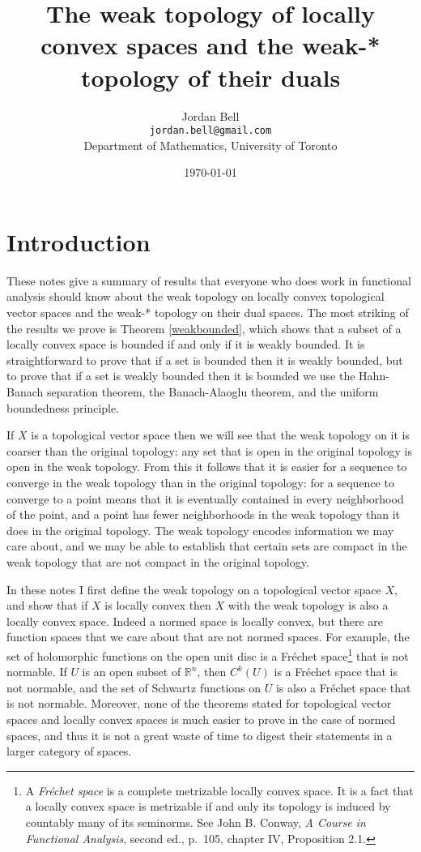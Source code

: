 \documentclass{article}
\begin{document}
\title{The weak topology of locally convex spaces and the weak-* topology of their duals}
\author{Jordan Bell\\ \texttt{jordan.bell@gmail.com}\\Department of Mathematics, University of Toronto}
\date{\today}
\maketitle

\section{Introduction}
These notes  give a summary of results that everyone who does work in functional analysis should know
about the weak topology on locally convex topological vector spaces and the weak-* topology on their dual spaces.
The most striking of the results we prove is Theorem \ref{weakbounded}, which shows that
a subset of a locally convex space is bounded if and only if it is weakly bounded. It is straightforward to prove that if a set
is bounded then it is weakly bounded, but to prove that if a set is weakly bounded then it is bounded we use the Hahn-Banach separation
theorem, the Banach-Alaoglu theorem, and the uniform boundedness principle.

If $X$ is a topological vector space then we will see that the weak topology on it is coarser than the original topology: any set that is open in the original
topology is open in the weak topology. From this it follows that it is easier for a sequence to converge in the weak topology than in the original topology:
 for a sequence to converge to a point means
that it is eventually contained in every neighborhood of the point, and a point has fewer neighborhoods in the weak topology than it does in the original
topology. The weak topology encodes information we may care about, and we may be able to establish
that certain sets are compact in the weak topology that are not compact in the original topology.


In these notes I first define the weak topology on a topological vector space $X$, and show that if $X$ is locally convex then $X$ with the weak topology is also a locally convex space.
 Indeed
a normed space is locally convex, but there are function spaces that we care about that are not normed spaces. For example, the set of holomorphic functions
on the open unit disc is a Fr\'echet space\footnote{A {\em Fr\'echet space} is a complete metrizable locally convex space.
It is a fact that a locally convex
 space is metrizable if and only its topology is induced by countably many of its seminorms. See John B. Conway, {\em A Course
 in Functional Analysis}, second ed., p.~105, chapter IV, Proposition 2.1.}  that is not normable. If $U$ is an open subset of $\mathbb{R}^n$, then $C^k(U)$ is a Fr\'echet space that is not normable, and the set of Schwartz functions on $U$ is also
a Fr\'echet space that is not normable. Moreover, none of the theorems stated for topological vector spaces and locally convex spaces is much easier to prove
in the case of normed spaces, and thus it is not a great waste of time to digest their statements in a larger category
of spaces.
\end{document}
